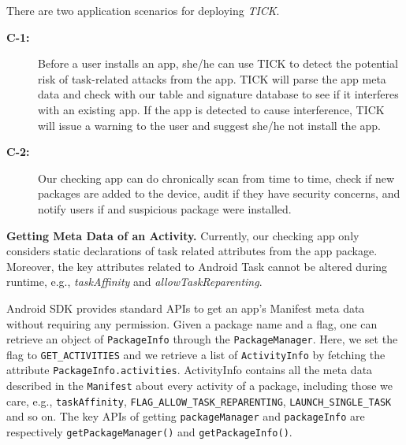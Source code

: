 \documentclass[letterpaper,12pt]{article}
\begin{document}
There are two application scenarios for deploying \textsl{TICK}.
\begin{description}

\item[\textbf{C-1:}] Before a user installs an app, she/he can use
  TICK to detect the potential risk of task-related attacks from the app.  TICK
  will parse the app meta data and check with our table and signature
  database to see if it interferes with an existing app. If the app is
  detected to cause interference, TICK will issue a
  warning to the user and suggest she/he not install the app.
\item[\textbf{C-2:}] Our checking app can do chronically scan from
  time to time, check if new packages are added to the device, audit
  if they have security concerns, and notify users if and suspicious
  package were installed.
\end{description}

\textbf{Getting Meta Data of an Activity.}  Currently, our checking app
only considers static declarations of task related attributes from the
app package. Moreover, the key attributes related to Android Task
cannot be altered during runtime, e.g., \textit{taskAffinity} and
\textit{allowTaskReparenting}.

Android SDK provides standard APIs to get an app's Manifest meta data
without requiring any permission. Given a package name and a flag, one
can retrieve an object of \texttt{PackageInfo} through the
\texttt{PackageManager}. Here, we set the flag to
\texttt{GET\_ACTIVITIES} and we retrieve a list of
\texttt{ActivityInfo} by fetching the attribute
\texttt{PackageInfo.activities}. ActivityInfo contains all the meta
data described in the \texttt{Manifest} about every activity of a
package, including those we care, e.g., \texttt{taskAffinity},
\texttt{FLAG\_ALLOW\_TASK\_REPARENTING}, \texttt{LAUNCH\_SINGLE\_TASK}
and so on. The key APIs of getting \texttt{packageManager} and
\texttt{packageInfo} are respectively \texttt{getPackageManager()} and
\texttt{getPackageInfo()}.
\end{document}

